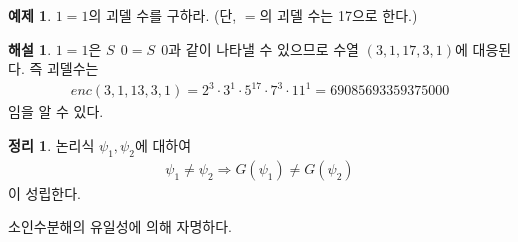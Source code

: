 \documentclass[b5paper, 11pt]{book}
\theoremstyle{definition}
\newtheorem{thm}[defn]{정리}
\newtheorem{ex}[defn]{예제}
\newtheorem*{ans*}{해설}
\newenvironment{pf*}{\pushQED{\qed}\pf}
{\popQED\endpf}
\begin{document}
\begin{ex}
    $1 = 1$의 괴델 수를 구하라. (단, $=$의 괴델 수는 17으로 한다.) 
\end{ex}
\begin{ans*}
    $1 = 1$은 $S\;\, 0 = S\;\, 0$과 같이 나타낼 수 있으므로 수열 $(3, 1, 17, 3, 1)$에 대응된다. 즉 괴델수는 
    \begin{align*}
        enc(3, 1, 13, 3, 1) = 2^3 \cdot 3^1 \cdot 5^{17} \cdot 7^3 \cdot 11^1 = 69085693359375000
    \end{align*}
    임을 알 수 있다.
\end{ans*}
\begin{thm}
    논리식 $\psi_1, \psi_2$에 대하여
    \begin{align*}
        \psi_1 \neq \psi_2 \Rightarrow G(\psi_1) \neq G(\psi_2)
    \end{align*}
    이 성립한다. 
\end{thm}
\begin{pf*}
    소인수분해의 유일성에 의해 자명하다.
\end{pf*}
\end{document}
